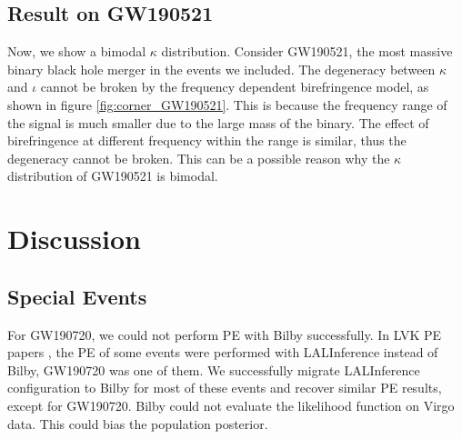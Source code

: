 \documentclass[aps,prd,twocolumn,superscriptaddress,preprintnumbers,floatfix,nofootinbib]{revtex4-2}
\begin{document}
\subsection{Result on GW190521}

Now, we show a bimodal $\kappa$ distribution.
Consider GW190521, the most massive binary black hole merger in the events we included.
The degeneracy between $\kappa$ and $\iota$ cannot be broken by the frequency dependent birefringence model, as shown in figure \ref{fig:corner_GW190521}.
This is because the frequency range of the signal is much smaller due to the large mass of the binary.
The effect of birefringence at different frequency within the range is similar, thus the degeneracy cannot be broken.
This can be a possible reason why the $\kappa$ distribution of GW190521 is bimodal.


\section{Discussion}
\label{sec:Discussion}

\subsection{Special Events}
For GW190720, we could not perform PE with Bilby successfully.
In LVK PE papers \citep{GWTC-2.1, GWTC-3}, the PE of some events were performed with LALInference \citep{lalsuite} instead of Bilby, GW190720 was one of them.
We successfully migrate LALInference configuration to Bilby for most of these events and recover similar PE results, except for GW190720.
Bilby could not evaluate the likelihood function on Virgo data.
This could bias the population posterior.
\end{document}
